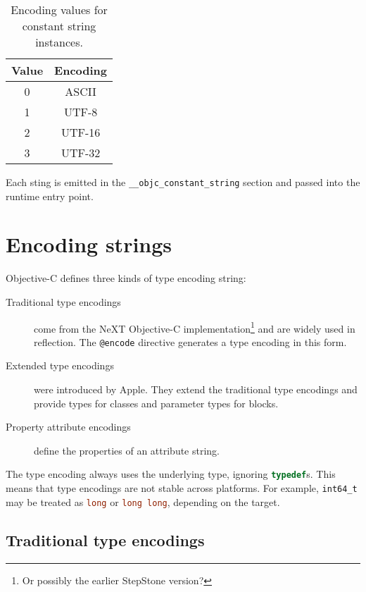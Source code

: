 \documentclass[a4paper]{report}
\newcommand{\ccode}[1]{\lstinline[language={C}]{#1}}
\newcommand{\objc}[1]{\lstinline[language={[Objective]C}]{#1}}
\newcommand{\inccode}[4]{
{
	 }}
	]{../#1}
}
}
\begin{document}
\inccode{loader.c}{nsconstantstring}{NSConstantString}{The constant string structure.}

\begin{table}
	\begin{center}
		\begin{tabular}{c|c}
			Value & Encoding \\ \hline
			0& ASCII \\
			1& UTF-8 \\
			2& UTF-16 \\
			3& UTF-32
		\end{tabular}
		\caption{\label{tab:nsconstantstring} Encoding values for constant string instances.}
	\end{center}
\end{table}

Each sting is emitted in the \ccode{__objc_constant_string} section and passed into the runtime entry point.

\chapter{Encoding strings}

Objective-C defines three kinds of type encoding string:

\begin{description}
	\item[Traditional type encodings] come from the NeXT Objective-C implementation\footnote{Or possibly the earlier StepStone version?} and are widely used in reflection.  The \objc{@encode} directive generates a type encoding in this form.
	\item[Extended type encodings] were introduced by Apple.  They extend the traditional type encodings and provide types for classes and parameter types for blocks.
	\item[Property attribute encodings] define the properties of an attribute string.
\end{description}

The type encoding always uses the underlying type, ignoring \ccode{typedef}s.
This means that type encodings are not stable across platforms.
For example, \ccode{int64_t} may be treated as \ccode{long} or \ccode{long long}, depending on the target.

\section{Traditional type encodings}
\end{document}
